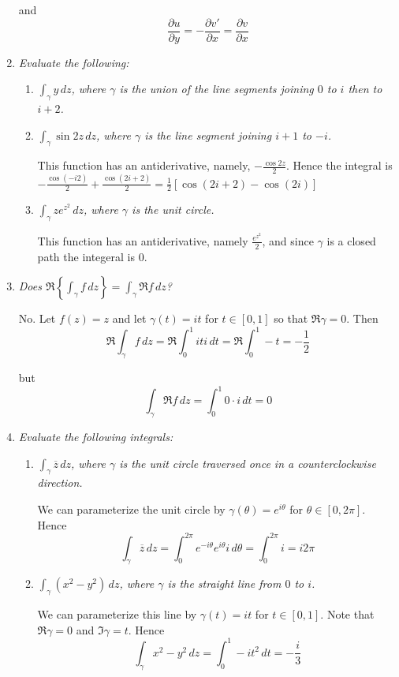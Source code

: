 \documentclass[letterpaper, 11pt]{article}
\begin{document}
\begin{enumerate}
and
\[
\frac{\partial u}{\partial y} = - \frac{\partial v'}{\partial x} = \frac{\partial v}{\partial x}
\]


\item \emph{Evaluate the following:}
\begin{enumerate}
\item \emph{$\int_{\gamma} y\,dz$, where $\gamma$ is the union of the line segments joining $0$ to $i$ then to $i+2$.}
\item \emph{$\int_{\gamma} \sin2z\,dz$, where $\gamma$ is the line segment joining $i+1$ to $-i$.}

This function has an antiderivative, namely, $-\frac{\cos2z}{2}$.  Hence the integral is $-\frac{\cos(-i2)}{2} + \frac{\cos(2i+2)}{2} = \frac{1}{2}\left[\cos(2i+2) - \cos(2i)\right]$
\item \emph{$\int_{\gamma} ze^{z^2}\,dz$, where $\gamma$ is the unit circle.}

This function has an antiderivative, namely $\frac{e^{z^2}}{2}$, and since $\gamma$ is a closed path the integeral is $0$.
\end{enumerate}

\item \emph{Does $\Re\left\{\int_{\gamma} f\,dz\right\} = \int_{\gamma} \Re f\,dz$?}

No.  Let $f(z) = z$ and let $\gamma(t) = it$ for $t \in [0,1]$ so that $\Re \gamma = 0$.  Then
\[
\Re \int_{\gamma} f \,dz = \Re \int_0^1 iti \,dt = \Re \int_0^1 -t = -\frac{1}{2}
\]

but
\[
\int_{\gamma} \Re f \,dz = \int_0^1 0 \cdot i\,dt = 0
\]

\item \emph{Evaluate the following integrals:}
\begin{enumerate}
\item \emph{$\int_{\gamma} \overline{z}\,dz$, where $\gamma$ is the unit circle traversed once in a counterclockwise direction.}

We can parameterize the unit circle by $\gamma(\theta) = e^{i\theta}$ for $\theta \in [0,2\pi]$.  Hence $$\int_{\gamma} \overline{z}\,dz = \int_0^{2\pi} e^{-i\theta}e^{i\theta}i \,d\theta = \int_0^{2\pi} i = i2\pi$$
\item \emph{$\int_{\gamma} (x^2-y^2)\,dz$, where $\gamma$ is the straight line from $0$ to $i$.}

We can parameterize this line by $\gamma(t) = it$ for $t \in [0,1]$. Note that $\Re \gamma = 0$ and $\Im \gamma = t$.  Hence $$\int_{\gamma} x^2 - y^2 \,dz = \int_0^1 -it^2 \,dt = -\frac{i}{3}$$
\end{enumerate}


\end{enumerate}
\end{document}
